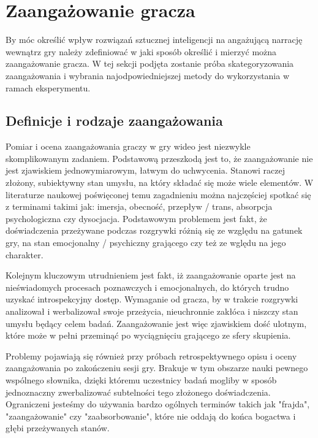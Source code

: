 \graphicspath{{chapters/chapter5/imgs/}}

\chapter{Zaangażowanie gracza}\label{chapter:ch5}

By móc określić wpływ rozwiązań sztucznej inteligencji na angażującą narrację wewnątrz gry należy
zdefiniować w jaki sposób określić i mierzyć można zaangażowanie gracza. W tej sekcji podjęta
zostanie próba skategoryzowania zaangażowania i wybrania najodpowiedniejszej metody do wykorzystania
w ramach eksperymentu.

\section{Definicje i rodzaje zaangażowania}\label{section:ch5_1}

Pomiar i ocena zaangażowania graczy w gry wideo jest niezwykle skomplikowanym zadaniem.
Podstawową przeszkodą jest to, że zaangażowanie nie jest zjawiskiem jednowymiarowym\cite{eng_in_games}, łatwym do
uchwycenia\cite{measuring_user_exp}. Stanowi raczej złożony, subiektywny stan umysłu, na który składać się
może wiele elementów. W literaturze naukowej poświęconej temu zagadnieniu można najczęściej spotkać się z terminami
takimi jak: imersja, obecność, przepływ / trans, absorpcja psychologiczna czy dysocjacja. Podstawowym problemem
jest fakt, że doświadczenia przeżywane podczas rozgrywki różnią się ze względu na gatunek gry, na stan
emocjonalny / psychiczny grającego czy też ze wględu na jego charakter\cite{measuring_user_exp}.

Kolejnym kluczowym utrudnieniem jest fakt, iż zaangażowanie oparte jest na
nieświadomych procesach poznawczych i emocjonalnych, do których trudno uzyskać
introspekcyjny dostęp\cite{measuring_user_exp}. Wymaganie od gracza, by w trakcie rozgrywki analizował i werbalizował swoje
przeżycia, nieuchronnie zakłóca i niszczy stan umysłu będący celem badań.
Zaangażowanie jest więc zjawiskiem dość ulotnym, które może w pełni przeminąć po wyciągnięciu grającego
ze sfery skupienia\cite{measuring_user_exp}.

Problemy pojawiają się również przy próbach retrospektywnego opisu i oceny zaangażowania po zakończeniu
sesji gry. Brakuje w tym obszarze nauki pewnego wspólnego słownika, dzięki któremu uczestnicy badań mogliby
w sposób jednoznaczny zwerbalizować subtelności tego złożonego doświadczenia\cite{measuring_user_exp}.
Ograniczeni jesteśmy do używania bardzo ogólnych terminów takich jak "frajda",
"zaangażowanie" czy "zaabsorbowanie", które nie oddają do końca bogactwa i głębi przeżywanych
stanów\cite{measuring_user_exp}.


